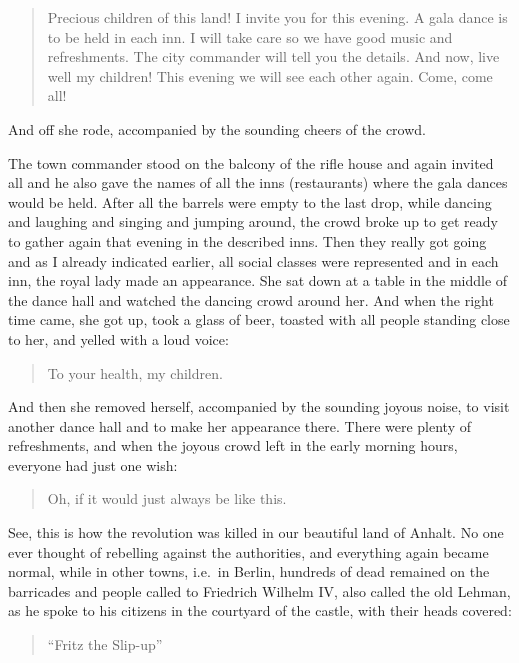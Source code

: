 \documentclass{article}
\begin{document}
\begin{quote}
Precious children of this land! I invite you for this evening. A gala dance is to be held in each inn. I will take care so we have good music and refreshments. The city commander will tell you the details. And now, live well my children! This evening we will see each other again. Come, come all!
\end{quote}

And off she rode, accompanied by the sounding cheers of the crowd.

The town commander stood on the balcony of the rifle house and again invited all and he also gave the names of all the inns (restaurants) where the gala dances would be held. After all the barrels were empty to the last drop, while dancing and laughing and singing and jumping around, the crowd broke up to get ready to gather again that evening in the described inns. Then they really got going and as I already indicated earlier, all social classes were represented and in each inn, the royal lady made an appearance. She sat down at a table in the middle of the dance hall and watched the dancing crowd around her. And when the right time came, she got up, took a glass of beer, toasted with all people standing close to her, and yelled with a loud voice:

\begin{quote}
To your health, my children.
\end{quote}

And then she removed herself, accompanied by the sounding joyous noise, to visit another dance hall and to make her appearance there. There were plenty of refreshments, and when the joyous crowd left in the early morning hours, everyone had just one wish:

\begin{quote}
Oh, if it would just always be like this.
\end{quote}

See, this is how the revolution was killed in our beautiful land of Anhalt. No one ever thought of rebelling against the authorities, and everything again became normal, while in other towns, i.e.~in Berlin, hundreds of dead remained on the barricades and people called to Friedrich Wilhelm IV, also called the old Lehman, as he spoke to his citizens in the courtyard of the castle, with their heads covered:

\begin{quote}
``Fritz the Slip-up''
\end{quote}
\end{document}
